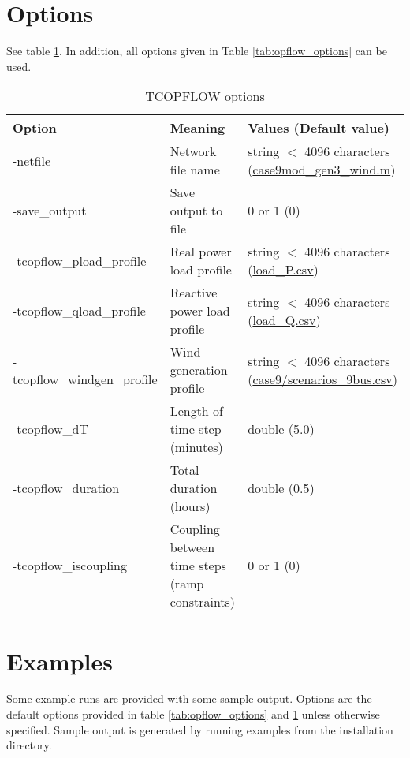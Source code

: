 \section{Options}
See table \ref{tab:tcopflow_options}. In addition, all \opflow options given in Table \ref{tab:opflow_options} can be used.
\begin{table}[!htbp]
  \caption{TCOPFLOW options}
  \small
  \begin{tabular}{|p{}|p{}|p{}|}
    \hline
    \textbf{Option} & \textbf{Meaning} & \textbf{Values (Default value)} \\ \hline
    -netfile & Network file name & string $<$ 4096 characters (\href{https://gitlab.pnnl.gov/exasgd/frameworks/exago/-/blob/master/datafiles/case9/case9mod_gen3_wind.m}{case9mod\_gen3\_wind.m}) \\ \hline
    -save\_output & Save output to file & 0 or 1 (0) \\ \hline
    -tcopflow\_pload\_profile & Real power load profile & string $<$ 4096 characters (\href{https://gitlab.pnnl.gov/exasgd/frameworks/exago/-/blob/master/datafiles/case9/load_P.csv}{load\_P.csv}) \\ \hline
    -tcopflow\_qload\_profile & Reactive power load profile & string $<$ 4096 characters (\href{https://gitlab.pnnl.gov/exasgd/frameworks/exago/-/blob/master/datafiles/case9/load_Q.csv}{load\_Q.csv}) \\ \hline
    -tcopflow\_windgen\_profile & Wind generation profile & string $<$ 4096 characters (\href{https://gitlab.pnnl.gov/exasgd/frameworks/exago/-/blob/master/datafiles/case9/scenarios_9bus.csv}{case9/scenarios\_9bus.csv}) \\ \hline
    -tcopflow\_dT & Length of time-step (minutes) & double (5.0) \\ \hline
    -tcopflow\_duration & Total duration (hours) & double (0.5) \\ \hline 
    -tcopflow\_iscoupling & Coupling between time steps (ramp constraints) & 0 or 1 (0) \\ \hline
  \end{tabular}
  \label{tab:tcopflow_options}
\end{table}
\section{Examples}
Some \tcopflow example runs are provided with some sample output. Options are the default options provided in table \ref{tab:opflow_options} and \ref{tab:tcopflow_options} unless otherwise specified. Sample output is generated by running examples from the installation directory.

